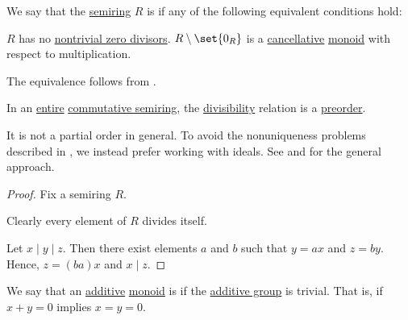 \begin{definition}\label{def:entire_semiring}
  We say that the \hyperref[def:semiring]{semiring} \( R \) is  if any of the following equivalent conditions hold:
  \begin{thmenum}
     \( R \) has no \hyperref[def:divisibility/zero]{nontrivial zero divisors}.
     \( R \setminus \set{ 0_R } \) is a \hyperref[def:magma/cancellative]{cancellative} \hyperref[def:monoid]{monoid} with respect to multiplication.
  \end{thmenum}
\end{definition}
\begin{defproof}
  The equivalence follows from .
\end{defproof}

\begin{proposition}\label{thm:semiring_divisibility_order}
  In an \hyperref[def:entire_semiring]{entire} \hyperref[def:semiring/commutative]{commutative semiring}, the \hyperref[def:divisibility]{divisibility} relation is a \hyperref[def:preordered_set]{preorder}.

  It is not a partial order in general. To avoid the nonuniqueness problems described in , we instead prefer working with ideals. See  and  for the general approach.
\end{proposition}
\begin{proof}
  Fix a semiring \( R \).

   Clearly every element of \( R \) divides itself.

   Let \( x \mid y \mid z \). Then there exist elements \( a \) and \( b \) such that \( y = a x \) and \( z = b y \). Hence, \( z = (ba) x \) and \( x \mid z \).
\end{proof}

\begin{definition}\label{def:zerosumfree}
  We say that an \hyperref[rem:additive_magma]{additive} \hyperref[def:monoid]{monoid} is  if the \hyperref[thm:invertible_submonoid_is_group]{additive group} is trivial. That is, if \( x + y = 0 \) implies \( x = y = 0 \).
\end{definition}


